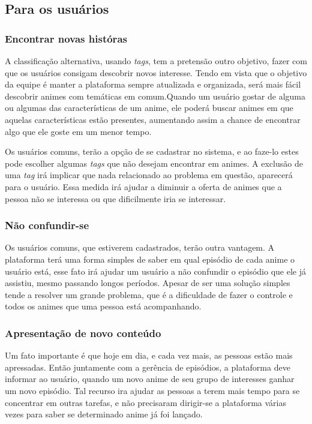 \documentclass[
	12pt,				%
	openright,			%
	twoside,			%
	a4paper,			%
	Times,
	brazil,				%
	]{abntex2}
\begin{document}
\subsection{Para os usuários}
\subsubsection{Encontrar novas históras}
A classificação alternativa, usando \textit{tags}, tem a pretensão outro objetivo, fazer com que os usuários consigam descobrir novos interesse. Tendo em vista que o objetivo da equipe é manter a plataforma sempre atualizada e organizada, será mais fácil descobrir animes com temáticas em comum.Quando um usuário gostar de alguma ou algumas das características de um anime, ele poderá buscar animes em que aquelas características estão presentes, aumentando assim a chance de encontrar algo que ele goste em um menor tempo.
\par

Os usuários comuns, terão a opção de se cadastrar no sistema, e ao faze-lo estes pode escolher algumas  \textit{tags} que não desejam encontrar em animes. A exclusão de uma  \textit{tag} irá implicar que nada relacionado ao problema em questão, aparecerá para o usuário. Essa medida irá ajudar a diminuir a oferta de animes que a pessoa não se interessa ou que dificilmente iria se interessar.
\par

\subsubsection{Não confundir-se}
Os usuários comuns, que estiverem cadastrados, terão outra vantagem. A plataforma terá uma forma simples de saber em qual episódio de cada anime o usuário está, esse fato irá ajudar um usuário a não confundir o episódio que ele já assistiu, mesmo passando longos períodos. Apesar de ser uma solução simples tende a resolver um grande problema, que é a dificuldade de fazer o controle e todos os animes que uma pessoa está acompanhando. 
\par

\subsubsection{Apresentação de novo conteúdo}
\par
Um fato importante é que hoje em dia, e cada vez mais, as pessoas estão mais apressadas. Então juntamente com a gerência de episódios, a plataforma deve informar ao usuário, quando um novo anime de seu grupo de interesses ganhar um novo episódio. Tal recurso ira ajudar as pessoas a terem mais tempo para se concentrar em outras tarefas, e não precisaram dirigir-se a plataforma várias vezes para saber se determinado anime já foi lançado.
\end{document}

